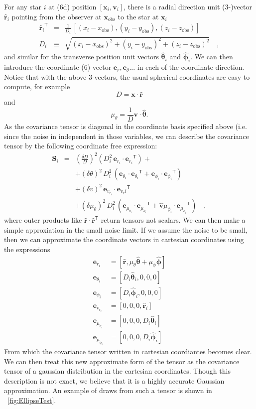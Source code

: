 \documentclass[12pt,preprint]{aastex}
\theoremstyle{plain}
\theoremstyle{definition}
\newcommand{\mtensor}[1]{\boldsymbol{#1}}
\newcommand{\mS}{\mtensor{S}}
\newcommand{\mvector}[1]{\mtensor{#1}}
\renewcommand{\vr}{\mvector{r}}
\newcommand{\vv}{\mvector{v}}
\newcommand{\vx}{\mvector{x}}
\newcommand{\ve}[1]{\mvector{e}_{#1}}
\newcommand{\vtheta}{\mvector{\theta}}
\newcommand{\vphi}{\mvector{\phi}}
\newcommand{\transpose}[1]{{#1}^{\textsf{T}}}
\newcommand{\rhat}{\hat{\vr}}
\newcommand{\thetahat}{\hat{\vtheta}}
\newcommand{\phihat}{\hat{\vphi}}
\newcommand{\vhat}{\hat{\vv}}
\newcommand{\obs}{\mathrm{obs}}
\newcommand{\vxobs}{\vx_{\mathrm{obs}}}
\begin{document}
For any star $i$ at (6d) position $[\vx_i,\vv_i]$, there is a radial
direction unit (3-)vector $\rhat_i$ pointing from the observer at $\vxobs$
to the star at $\vx_i$
\begin{eqnarray}\displaystyle
\transpose{\rhat_i} &=& \frac{1}{D_i}\,[(x_i-x_\obs), (y_i-y_\obs), (z_i-z_\obs)]
\nonumber\\
D_i &\equiv& \sqrt{(x_i-x_\obs)^2+(y_i-y_\obs)^2+(z_i-z_\obs)^2}
\quad,
\end{eqnarray}
and similar for the transverse position unit vectors $\thetahat_i$ and
$\phihat_i$. We can then introduce the coordinate (6) vector $\ve{r},\ve{\theta}...$ in each of the coordinate direction. Notice that with the above 3-vectors, the usual spherical coordinates are easy to compute, for example 
\[
D = \vx\cdot\rhat
\]
and
\[
\mu_\theta = \frac{1}{D}\vv\cdot\thetahat.
\]
As the covariance tensor is diagonal in the coordinate basis specified above (i.e. since the noise in independent in those variables, we can describe the covariance tensor by the following coordinate free expression:\begin{eqnarray}\displaystyle
\mS_i &=&
  \left(\frac{\delta D}{D}\right)^2
    (D_i^2\,\ve{r_i}\cdot\transpose{\ve{r_i}}) +
 \nonumber\\
&&+ (\delta\theta)^2\,D_i^2\,
    (\ve{\theta_i}\cdot\transpose{\ve{\theta_i}}
   + \ve{\phi_i}\cdot\transpose{\ve{\phi_i}})
\nonumber\\
&&+ (\delta v)^2\,\ve{v_{r_i}}\cdot\transpose{\ve{v_r i}}
\nonumber\\
&&+ (\delta\mu_{\theta})^2\,D_i^2\,
    (\ve{\mu_{\theta_i}}\cdot\transpose{\ve{\mu_{\theta_i}}}
   + \vhat{\mu_{\phi_i}}\cdot\transpose{\ve{\mu_{\phi_i}}})
\quad ,
\end{eqnarray}
where outer products like $\rhat\cdot\transpose{\rhat}$ return tensors not scalars. We can then make a simple approxiation in the small noise limit. If we assume the noise to be small, then we can approximate the coordinate vectors in cartesian coordinates using the expressions
\begin{subequations}
\begin{align}
\ve{r_i} &= [\rhat, \mu_\theta \thetahat + \mu_\phi \phihat] \\
\ve{\theta_i} &= [D_i\thetahat_i, 0,0,0]\\
\ve{\phi_i} &= [D_i\phihat_i,0,0,0]\\
\ve{v_{r_i}} &= [0,0,0,\rhat_i]\\
\ve{\mu_{\theta_i}} &= [0,0,0,D_i\thetahat_i] \\
\ve{\mu_{\phi_i}} &= [ 0,0,0, D_i\phihat_i]
\end{align}
\end{subequations}
From which the covariance tensor  written in cartesian coordiantes becomes clear. We can then treat this new approximate form of the tensor as the covariance tensor of a gaussian distribution in the cartesian coordinates. Though this description is not exact, we believe that it is a highly accurate Gaussian approximation.  An example of draws from such a tensor is shown in
\figurename~\ref{fig:EllipseTest}.
\end{document}
